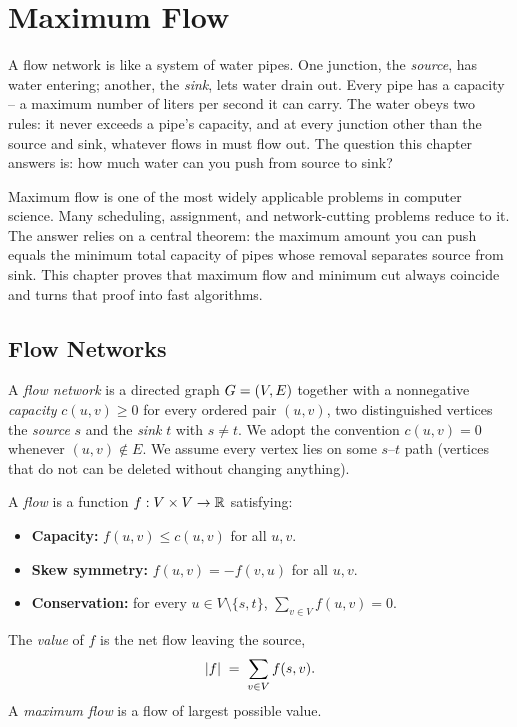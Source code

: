 \chapter{Maximum Flow}

A flow network is like a system of water pipes. One junction, the
\emph{source}, has water entering; another, the \emph{sink}, lets
water drain out. Every pipe has a capacity -- a maximum number of liters per
second it can carry. The water obeys two rules: it never exceeds a pipe's
capacity, and at every junction other than the source and sink, whatever flows in
must flow out. The question this chapter answers is:
how much water can you push from source to sink?

Maximum flow is one of the most widely applicable
problems in computer science. Many scheduling, assignment, and network-cutting
problems reduce to it. The answer relies on a central theorem: the maximum amount you can push equals the minimum total
capacity of pipes whose removal separates source from sink. This chapter proves that
maximum flow and minimum cut always coincide and turns that proof into fast algorithms.

\chapterline

\section{Flow Networks}
\label{ch12:networks}

\begin{definition}
\label{ch12:def-network}
A \emph{flow network} is a directed graph $G=(V,E)$ together with a
nonnegative \emph{capacity} $c(u,v)\ge 0$ for every ordered pair $(u,v)$, two
distinguished vertices the \emph{source} $s$ and the \emph{sink} $t$ with $s\neq
t$. We adopt the convention $c(u,v)=0$ whenever $(u,v)\notin E$. We assume every
vertex lies on some $s$--$t$ path (vertices that do not can be deleted without
changing anything).
\end{definition}

\begin{definition}[Flow]
\label{ch12:def-flow}
A \emph{flow} is a function $f:V\times V\to\mathbb{R}$ satisfying:
\begin{itemize}
  \item \textbf{Capacity:} $f(u,v)\le c(u,v)$ for all $u,v$.
  \item \textbf{Skew symmetry:} $f(u,v)=-f(v,u)$ for all $u,v$.
  \item \textbf{Conservation:} for every $u\in V\setminus\{s,t\}$,
        $\displaystyle\sum_{v\in V} f(u,v)=0$.
\end{itemize}
The \emph{value} of $f$ is the net flow leaving the source,
\[
  \lvert f\rvert \;=\; \sum_{v\in V} f(s,v).
\]
A \emph{maximum flow} is a flow of largest possible value.
\end{definition}


